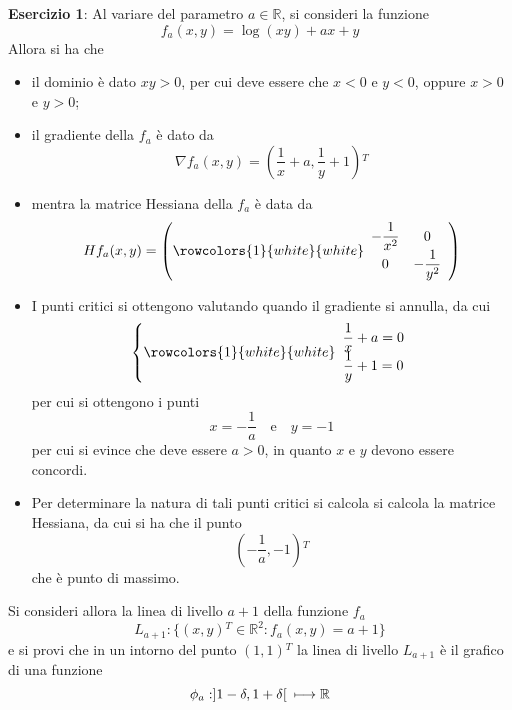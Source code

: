 \documentclass[a4paper]{extarticle}
\begin{document}
\vspace{2em}
\noindent
\textbf{Esercizio 1}: Al variare del parametro $a \in \mathbb{R}$, si consideri la funzione
\[f_a(x,y) = \log(xy)+ax+y\]
Allora si ha che
\begin{itemize}
    \item il dominio è dato $xy > 0$, per cui deve essere che $x<0$ e $y<0$, oppure $x>0$ e $y>0$;
    \item il gradiente della $f_a$ è dato da
    \[\nabla f_a(x,y) = \left(\dfrac{1}{x} + a, \dfrac{1}{y} + 1\right){^T}\]
    \item mentra la matrice Hessiana della $f_a$ è data da
    \[H f_a(x,y) = \left(
        \rowcolors{1}{white}{white}
        \begin{array}{cc}
            -\dfrac{1}{x^2} & 0\\
            0 & -\dfrac{1}{y^2}\\
        \end{array}
    \right)\]
    \item I punti critici si ottengono valutando quando il gradiente si annulla, da cui
    \[\left\{
        \rowcolors{1}{white}{white}
        \begin{array}{cc}
            \dfrac{1}{x}+a=0\\
            \dfrac{1}{y}+1=0\\
        \end{array}
    \right.\]
    per cui si ottengono i punti
    \[x=-\dfrac{1}{a} \hspace{1em} \text{e} \hspace{1em} y=-1\]
    per cui si evince che deve essere $a>0$, in quanto $x$ e $y$ devono essere concordi.
    \item Per determinare la natura di tali punti critici si calcola si calcola la matrice Hessiana, da cui si ha che il punto
    \[\left(-\dfrac{1}{a},-1\right){^T}\]
    che è punto di massimo.
\end{itemize}
Si consideri allora la linea di livello $a+1$ della funzione $f_a$
\[L_{a+1} : \{(x,y){^T} \in \mathbb{R}^2 : f_a(x,y) = a+1\}\]
e si provi che in un intorno del punto $(1,1){^T}$ la linea di livello $L_{a+1}$ è il grafico di una funzione
\[\phi_a : ]1-\delta,1+\delta[ \hspace{0.5em} \longmapsto \mathbb{R}\]
\end{document}
